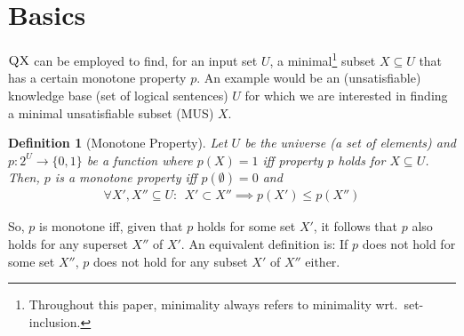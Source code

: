 \documentclass[]{elsarticle}
\newcommand{\scQX}{{\textsc{QX}}}
\newtheorem{definition}{Definition}[]{}
\begin{document}
	
	
	\section{Basics}
	\label{sec:basics}
	$\scQX$ can be employed to find, for an input set $U$, a minimal\footnote{Throughout this paper, minimality always refers to minimality wrt.\ set-inclusion.} 
	subset $X \subseteq U$ that has a certain monotone property $p$. An example would be an (unsatisfiable) knowledge base (set of logical sentences) $U$ for which we are interested in finding a minimal unsatisfiable subset (MUS) $X$.
	\begin{definition}[Monotone Property]\label{def:monotonic_property}
		Let $U$ be the universe (a set of elements) and $p:2^U \to \{0,1\}$ be a function where $p(X)=1$ iff property $p$ holds for $X\subseteq U$. 
		Then, $p$ is a monotone property iff $p(\emptyset)=0$ and
		\begin{align*}
		\forall X', X'' \subseteq U:\;\, X' \subset X'' \implies p(X') \leq p(X'')
		\end{align*}
	\end{definition}
	So, $p$ is monotone iff, given that $p$ holds for some set $X'$, it follows that $p$ also holds for any superset $X''$ of $X'$. 
	An equivalent definition is: If $p$ does not hold for some set $X''$, $p$ does not hold for any subset $X'$ of $X''$ either.
	
\end{document}
